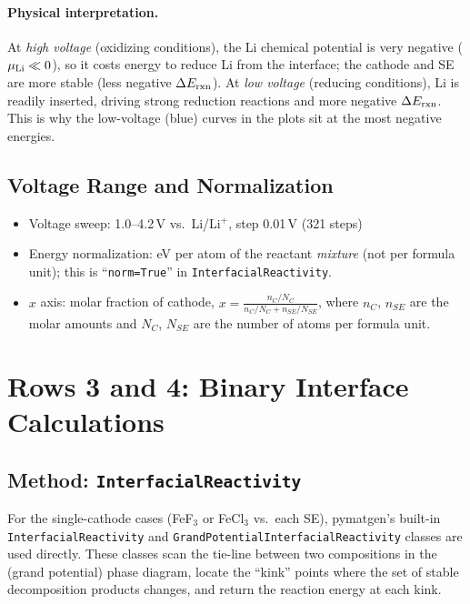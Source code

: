 \documentclass[11pt,letterpaper]{article}
\begin{document}
\paragraph{Physical interpretation.}
At \emph{high voltage} (oxidizing conditions), the Li chemical potential is
very negative ($\mu_{\rm Li} \ll 0$), so it costs energy to reduce Li from
the interface; the cathode and SE are more stable (less negative
$\Delta E_{\rm rxn}$). At \emph{low voltage} (reducing conditions),
Li is readily inserted, driving strong reduction reactions and more negative
$\Delta E_{\rm rxn}$. This is why the low-voltage (blue) curves in the
plots sit at the most negative energies.

\subsection{Voltage Range and Normalization}

\begin{itemize}
  \item Voltage sweep: 1.0--4.2\,V vs.\ Li/Li$^+$, step 0.01\,V (321 steps)
  \item Energy normalization: eV per atom of the reactant \emph{mixture}
        (not per formula unit); this is ``\texttt{norm=True}'' in
        \texttt{InterfacialReactivity}.
  \item $x$ axis: molar fraction of cathode, $x = \frac{n_C/N_C}{n_C/N_C + n_{SE}/N_{SE}}$,
        where $n_C$, $n_{SE}$ are the molar amounts and $N_C$, $N_{SE}$
        are the number of atoms per formula unit.
\end{itemize}

\section{Rows 3 and 4: Binary Interface Calculations}

\subsection{Method: \texttt{InterfacialReactivity}}

For the single-cathode cases (FeF$_3$ or FeCl$_3$ vs.\ each SE),
pymatgen's built-in \texttt{InterfacialReactivity} and
\texttt{GrandPotentialInterfacialReactivity} classes are used directly.
These classes scan the tie-line between two compositions in the (grand
potential) phase diagram, locate the ``kink'' points where the set of
stable decomposition products changes, and return the reaction energy
at each kink.
\end{document}
